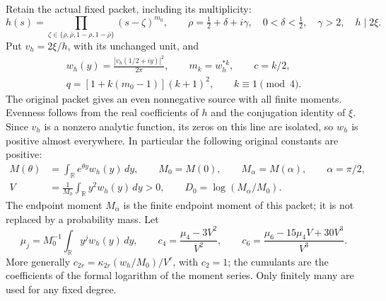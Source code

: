 \documentclass[11pt,a4paper]{article}
\begin{document}
Retain the actual fixed packet, including its multiplicity:
\[
 h(s)=\prod_{\zeta\in\{\rho,\bar\rho,1-\rho,1-\bar\rho\}}
       (s-\zeta)^{m_0},\qquad
 \rho=\tfrac12+\delta+i\gamma,\quad
 0<\delta<\tfrac12,\quad\gamma>2,\quad h\mid2\xi.
\]
Put \(v_h=2\xi/h\), with its unchanged unit, and
\[
\begin{gathered}
 w_h(y)=\frac{|v_h(1/2+iy)|^2}{2\pi},\qquad
 m_k=w_h^{*k},\qquad c=k/2,\\
 q=[1+k(m_0-1)](k+1)^2,\qquad k\equiv1\pmod4.
\end{gathered}
\]
The original packet gives an even nonnegative source with all finite moments.
Evenness follows from the real coefficients of \(h\) and the conjugation
identity of \(\xi\). Since \(v_h\) is a nonzero analytic function, its
zeros on this line are isolated, so \(w_h\) is positive almost everywhere.
In particular the following original constants are positive:
\begin{equation}
 \begin{split}
 M(\theta)&=\int_{\mathbb R}e^{\theta y}w_h(y)\,dy,\qquad
 M_0=M(0),\qquad M_\alpha=M(\alpha),\qquad \alpha=\pi/2,\\
 V&=\frac1{M_0}\int_{\mathbb R}y^2w_h(y)\,dy>0,\qquad
 D_0=\log(M_\alpha/M_0).
 \end{split}
 \tag{FCD1}\label{a02gmf:eq:FCD1}
\end{equation}
The endpoint moment \(M_\alpha\) is the finite endpoint moment of this
packet; it is not replaced by a probability mass. Let
\[
 \mu_j=M_0^{-1}\int_{\mathbb R}y^jw_h(y)\,dy,\qquad
 c_4=\frac{\mu_4-3V^2}{V^2},\qquad
 c_6=\frac{\mu_6-15\mu_4V+30V^3}{V^3}.
\]
More generally \(c_{2r}=\kappa_{2r}(w_h/M_0)/V^r\), with \(c_2=1\);
the cumulants are the coefficients of the formal logarithm of the moment
series. Only finitely many are used for any fixed degree.
\end{document}
